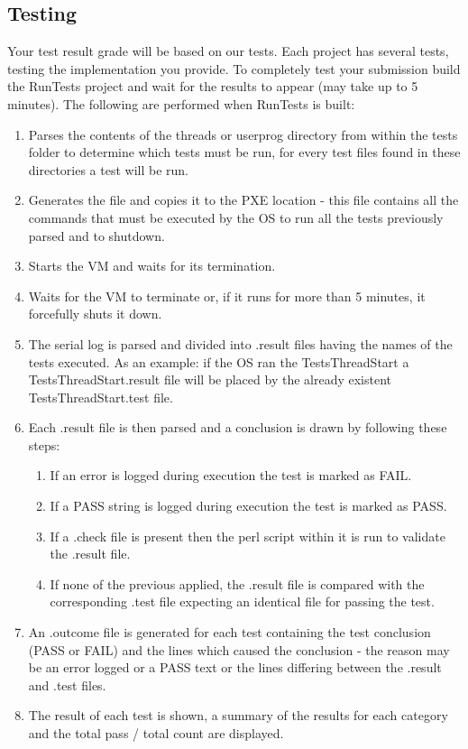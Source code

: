 \subsection{Testing}
\label{sect:Testing}

Your test result grade will be based on our tests. Each project has several tests, testing the
implementation you provide. To completely test your submission build the RunTests project and wait
for the results to appear (may take up to 5 minutes). The following are performed when RunTests is
built:
\begin{enumerate}
	\item Parses the contents of the threads or userprog directory from within the tests folder to
determine which tests must be run, for every test files found in these directories a test will be
run.

	\item Generates the  file and copies it to the PXE location - this file
contains all the commands that must be executed by the OS to run all the tests previously parsed
and to shutdown.

	\item Starts the \projectname VM and waits for its termination.

	\item Waits for the VM to terminate or, if it runs for more than 5 minutes, it forcefully shuts
it down.

	\item The serial log is parsed and divided into .result files having the names of the tests
executed. As an example: if the OS ran the TestsThreadStart a TestsThreadStart.result file will be
placed by the already existent TestsThreadStart.test file.

	\item Each .result file is then parsed and a conclusion is drawn by following these steps:
	
	\begin{enumerate}
		\item If an error is logged during execution the test is marked as FAIL.
		\item If a PASS string is logged during execution the test is marked as PASS.
		\item If a .check file is present then the perl script within it is run to validate the
	.result file.
		\item If none of the previous applied, the  .result file is compared with the corresponding
		.test file expecting an identical file for passing the test.
	\end{enumerate}

	\item An .outcome file is generated for each test containing the test conclusion (PASS or FAIL)
and the lines which caused the conclusion - the reason may be an error logged or a PASS text or the
lines differing between the .result and .test files.

	\item The result of each test is shown, a summary of the results for each category and the total
pass / total count are displayed.
\end{enumerate}

